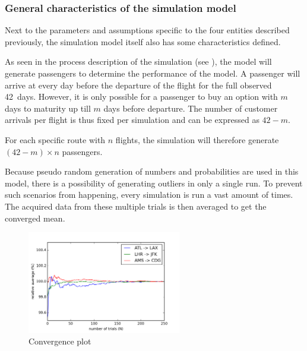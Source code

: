 \subsubsection{General characteristics of the simulation model}
Next to the parameters and assumptions specific to the four entities described previously, the simulation model itself also has some characteristics defined.

As seen in the process description of the simulation (see ), the model will generate passengers to determine the performance of the model. A passenger will arrive at every day before the departure of the flight for the full observed 42~days. However, it is only possible for a passenger to buy an option with $m$ days to maturity up till $m$ days before departure. The number of customer arrivals per flight is thus fixed per simulation and can be expressed as $42 - m$.

For each specific route with $n$ flights, the simulation will therefore generate $(42 - m) \times n$ passengers.

Because pseudo random generation of numbers and probabilities are used in this model, there is a possibility of generating outliers in only a single run. To prevent such scenarios from happening, every simulation is run a vast amount of times. The acquired data from these multiple trials is then averaged to get the converged mean.


\begin{figure}
\centering
\includegraphics[width=0.6\textwidth]{figures/ConvergencePlot_multiple}
\caption{Convergence plot}
\label{fig:ConvergencePlotMultiple}
\end{figure}
